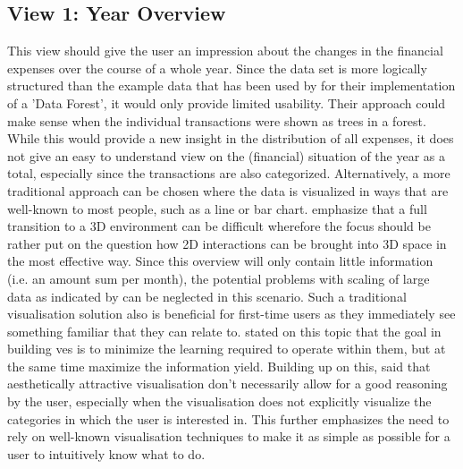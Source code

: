 
\subsection{View 1: Year Overview}

This view should give the user an impression about the changes in the financial expenses over the course of a whole year. Since the data set is more logically structured than the example data that has been used by \cite{Jamieson2007} for their implementation of a 'Data Forest', it would only provide limited usability. Their approach could make sense when the individual transactions were shown as trees in a forest. While this would provide a new insight in the distribution of all expenses, it does not give an easy to understand view on the (financial) situation of the year as a total, especially since the transactions are also categorized. \newline
Alternatively, a more traditional approach can be chosen where the data is visualized in ways that are well-known to most people, such as a line or bar chart. \cite{Drouhard2015} emphasize that a full transition to a 3D environment can be difficult wherefore the focus should be rather put on the question how 2D interactions can be brought into 3D space in the most effective way. Since this overview will only contain little information (i.e. an amount sum per month), the potential problems with scaling of large data as indicated by \cite{Jamieson2007} can be neglected in this scenario. Such a traditional visualisation solution also is beneficial for first-time users as they immediately see something familiar that they can relate to. \cite{Wann1996} stated on this topic that the goal in building \glspl{ve} is to minimize the learning required to operate within them, but at the same time maximize the information yield. Building up on this, \cite{Burlutskiy2014a} said that aesthetically attractive visualisation don't necessarily allow for a good reasoning by the user, especially when the visualisation does not explicitly visualize the categories in which the user is interested in. This further emphasizes the need to rely on well-known visualisation techniques to make it as simple as possible for a user to intuitively know what to do. \newline
